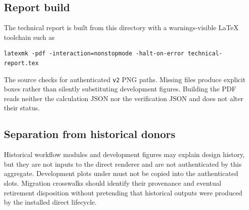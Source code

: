 \subsection{Report build}

The technical report is built from this directory with a warnings-visible LaTeX toolchain
such as
\begin{verbatim}
latexmk -pdf -interaction=nonstopmode -halt-on-error technical-report.tex
\end{verbatim}
The source checks for authenticated \texttt{v2} PNG paths.  Missing files produce
explicit boxes rather than silently substituting development figures.  Building the PDF
reads neither the calculation JSON nor the verification JSON and does not alter their
status.

\subsection{Separation from historical donors}

Historical workflow modules and development figures may explain design history, but they
are not inputs to the direct renderer and are not authenticated by this aggregate.
Development plots under  must not be copied into the
authenticated slots.  Migration crosswalks should identify their provenance and eventual
retirement disposition without pretending that historical outputs were produced by the
installed direct lifecycle.
